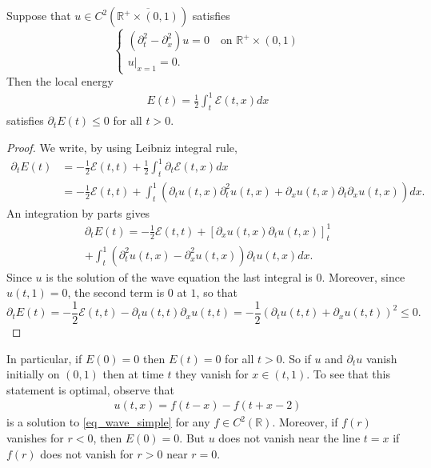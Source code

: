 \documentclass[12pt,oneside,final]{amsart}
\def\R{\mathbb R}
\begin{document}
\begin{theorem}
	Suppose that $u \in C^2(\overline{{\R}^+\times (0,1)}) $ satisfies
	\begin{equation}\label{eq_wave_simple}
		\begin{cases}
			(\partial_t^2 - \partial_x^2) u = 0 \quad \text{on } \mathbb{R}^+\times (0,1)\\
			\left.u\right|_{x=1} = 0.
		\end{cases}
	\end{equation}
	Then the local energy
	\begin{align*}
		E(t) = \frac{1}{2} \int_t^1 \mathcal{E}(t,x) dx 
	\end{align*}
	satisfies $\partial_t E(t) \le 0$ for all $t > 0$.
\end{theorem}
\begin{proof}
	We write, by using Leibniz integral rule,
	\begin{align*}
		\partial_t E(t) &= - \frac{1}{2}  \mathcal{E}(t, t) + \frac{1}{2} \int_{t}^{1} \partial_t \mathcal{E} (t,x)dx \\
		& = - \frac{1}{2}  \mathcal{E}(t, t) + \int_{t}^{1}\left(  \partial_t u(t,x) \partial_t^2 u(t,x) + \partial_x u(t,x) \partial_{t}\partial_{x} u(t,x)\right) dx.
	\end{align*}
	An integration by parts gives
	\begin{multline*}
		\partial_t E(t) = - \frac{1}{2}  \mathcal{E}(t, t) + \left[\partial_x u(t,x)\partial_t u(t,x)\right]^{1}_{t}\\
		+ \int_{t}^{1} \left( \partial_t^2u(t,x) - \partial_x^2u(t,x)\right) \partial_t u(t,x) dx.
	\end{multline*}
	Since $u$ is the solution of the wave equation the last integral is $0$. Moreover, since $u(t,1) = 0$, the second term is $0$ at $1$, so that
	\begin{equation*}
		\partial_t E(t) = - \frac{1}{2}  \mathcal{E}(t, t) - \partial_tu(t,t)\partial_x u(t,t) = - \frac{1}{2}\left(\partial_tu(t,t) + \partial_x u(t,t)\right)^2\leq 0.
	\end{equation*}
\end{proof}


In particular, if $E(0) = 0$ then $E(t) = 0$ for all $t > 0$.
So if $u$ and $\partial_t u$ vanish initially on $(0,1)$ then at time $t$ they vanish for $x \in (t,1)$.
To see that this statement is optimal, observe that 
	\begin{align*}
u(t, x) = f(t - x) - f(t + x - 2)
	\end{align*}
is a solution to \eqref{eq_wave_simple} for any $f \in C^2(\R)$. Moreover, if $f(r)$ vanishes for $r < 0$, then $E(0) = 0$. 
But $u$ does not vanish near the line $t = x$ if $f(r)$ does not vanish for $r > 0$ near $r=0$.
\end{document}

